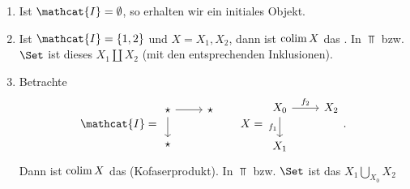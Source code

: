 \begin{example}
    \begin{enumerate}[1)]
        \item Ist $\mathcat{I} = \emptyset$, so erhalten wir ein initiales Objekt.
        \item Ist $\mathcat{I} = \left \{1,2\right\} $ und $X = X_1,X_2$, dann ist $\operatorname{colim} X$ das  . In $\Top$ bzw.  $\Set$ ist dieses  $X_1 \coprod X_2$ (mit den entsprechenden Inklusionen).
        \item Betrachte
            \[
            \mathcat{I} = 
            \begin{tikzcd}
                \star \ar{r} \ar{d} & \star \\
                \star
            \end{tikzcd}
            \qquad
            X = 
            \begin{tikzcd}
                X_0 \ar{r}{f_2} \ar[swap]{d}{f_1}&X_2 \\
                X_1
            \end{tikzcd}
            .\] 
            Dann ist $\operatorname{colim} X$ das   (Kofaserprodukt). In $\Top$ bzw.  $\Set$ ist das  $X_1 \bigcup\limits_{X_0} X_2$ 
    \end{enumerate}
\end{example}
